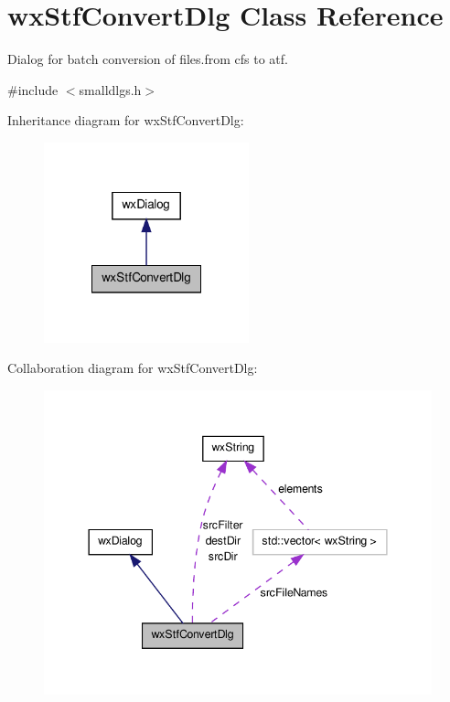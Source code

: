 \hypertarget{classwxStfConvertDlg}{
\section{wxStfConvertDlg Class Reference}
\label{classwxStfConvertDlg}
}


Dialog for batch conversion of files.from cfs to atf.  




{\ttfamily \#include $<$smalldlgs.h$>$}



Inheritance diagram for wxStfConvertDlg:
\nopagebreak
\begin{figure}[H]
\begin{center}
\leavevmode
\includegraphics[width=168pt]{classwxStfConvertDlg__inherit__graph}
\end{center}
\end{figure}


Collaboration diagram for wxStfConvertDlg:
\nopagebreak
\begin{figure}[H]
\begin{center}
\leavevmode
\includegraphics[width=344pt]{classwxStfConvertDlg__coll__graph}
\end{center}
\end{figure}
